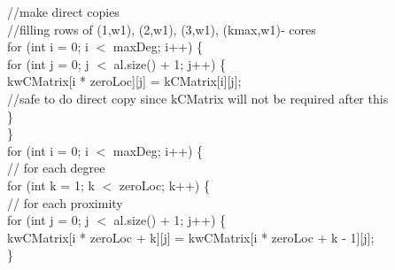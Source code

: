 \begin{ttfamily   }
\begin{scriptsize}
        \noindent//make direct copies \\
        \noindent//filling rows of (1,w1), (2,w1), (3,w1), (kmax,w1)- cores\\
        \noindent for (int i = 0;   i $<$ maxDeg;   i++) \{\\
            \noindent for (int j = 0;   j $<$ al.size() + 1;   j++) \{\\
                kwCMatrix[i * zeroLoc][j] = kCMatrix[i][j];\\
                \noindent//safe to do direct copy since kCMatrix will not be required after this\\
            \}\\
        \}\\

        \noindent for (int i = 0;   i $<$ maxDeg;   i++) \{\\\noindent// for each degree\\
            \noindent for (int k = 1;   k $<$ zeroLoc;   k++) \{\\\noindent// for each proximity\\
                \noindent for (int j = 0;   j $<$ al.size() + 1;   j++) \{\\
                    kwCMatrix[i * zeroLoc + k][j] = kwCMatrix[i * zeroLoc + k - 1][j];\\
                \}\\


\end{scriptsize}
\end{ttfamily   }
